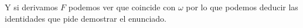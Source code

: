 \begin{problem}[14]
Y si derivamos $F$ podemos ver que coincide con $ω$ por lo que podemos deducir las identidades que pide demostrar el enunciado.




\end{problem}

